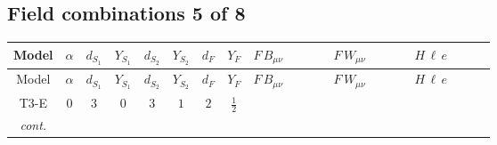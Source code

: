 \documentclass[8pt]{article}
\begin{document}
\begin{landscape}
\subsection*{Field combinations 5 of 8}
\begin{longtable}{@{}cccccccc >{\raggedright\arraybackslash}p{0.21\linewidth} >{\raggedright\arraybackslash}p{0.21\linewidth} >{\raggedright\arraybackslash}p{0.21\linewidth}@{}}
\toprule
Model & $\alpha$ & $d_{S_1}$ & $Y_{S_1}$ & $d_{S_2}$ & $Y_{S_2}$ & $d_F$ & $Y_F$ & $F\,B_{\mu\nu}$ & $F\,W_{\mu\nu}$ & $H\,\ell\,e$ \\
\midrule
\endfirsthead
\toprule
Model & $\alpha$ & $d_{S_1}$ & $Y_{S_1}$ & $d_{S_2}$ & $Y_{S_2}$ & $d_F$ & $Y_F$ & $F\,B_{\mu\nu}$ & $F\,W_{\mu\nu}$ & $H\,\ell\,e$ \\
\midrule
\endhead
T3-E & $0$ & $3$ & $0$ & $3$ & $1$ & $2$ & $\frac{1}{2}$ & \scriptsize\adjustbox{max width=\linewidth}{$\begin{gathered} -\frac{1}{2} \hbar  \log \left(\frac{\bar{\mu}^{2}}{M_F^2}\right) B_{\mu _1\mu _2}^2\end{gathered}$} & \scriptsize\adjustbox{max width=\linewidth}{$\begin{gathered} -\frac{1}{2} \hbar  \log \left(\frac{\bar{\mu}^{2}}{M_F^2}\right) \left(W_{\mu _1\mu _2}^{A_1}\right){}^2\end{gathered}$} & \scriptsize\adjustbox{max width=\linewidth}{$\begin{gathered} +\frac{\sqrt{3} \hbar  \overline{y_{1,i_3,r_1}} \overline{L_{a_1,i_2}}\, P_R\, e_{i_1} H_{a_1} y_{1,i_2,r_1} Y_{e,i_3,i_1}}{4 \epsilon } \\ +\frac{3}{8} \sqrt{3} \hbar  \overline{y_{1,i_3,r_1}} \overline{L_{a_1,i_2}}\, P_R\, e_{i_1} H_{a_1} y_{1,i_2,r_1} Y_{e,i_3,i_1} \\ +\frac{\sqrt{3} \hbar  \overline{y_{2,i_3,r_1}} \overline{L_{a_1,i_2}}\, P_R\, e_{i_1} H_{a_1} y_{2,i_2,r_1} Y_{e,i_3,i_1}}{4 \epsilon }\end{gathered}$} \\
\textit{cont.} &  &  &  &  &  &  &  &  &  & \scriptsize\adjustbox{max width=\linewidth}{$\begin{gathered} +\frac{3}{8} \sqrt{3} \hbar  \overline{y_{2,i_3,r_1}} \overline{L_{a_1,i_2}}\, P_R\, e_{i_1} H_{a_1} y_{2,i_2,r_1} Y_{e,i_3,i_1} \\ +\frac{\sqrt{3} \hbar  \overline{y_{1,i_1,r_1}} \overline{Y_{e,i_3,i_2}} \overline{e_{i_2}}\, P_L\, L_{a_1,i_1} y_{1,i_3,r_1} H_{a_1}{}^{\dagger }}{4 \epsilon } \\ +\frac{3}{8} \sqrt{3} \hbar  \overline{y_{1,i_1,r_1}} \overline{Y_{e,i_3,i_2}} \overline{e_{i_2}}\, P_L\, L_{a_1,i_1} y_{1,i_3,r_1} H_{a_1}{}^{\dagger }\end{gathered}$} \\

\end{longtable}
\end{landscape}
\end{document}
